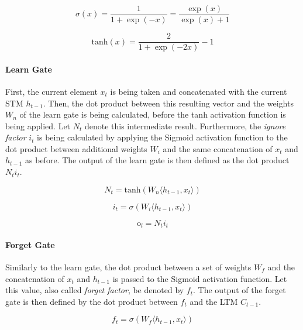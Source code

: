 \documentclass[11pt]{scrartcl}
\begin{document}
\begin{equation}
\label{eq:activation_sigmoid}
	\sigma(x) = \frac{1}{1 + \exp(-x)} = \frac{\exp(x)}{\exp(x) + 1}
\end{equation}

\begin{equation}
\label{eq:activation_tanh}
	\text{tanh}(x) = \frac{2}{1 + \exp(-2x)} -1
\end{equation}

\paragraph*{\textcolor{viridis3}{\textbf{Learn Gate}}}
First, the current element $x_t$ is being taken and concatenated with the current STM $h_{t-1}$. Then, the dot product between this resulting vector and the weights $W_n$ of the learn gate is being calculated, before the tanh activation function is being applied. Let $N_t$ denote this intermediate result. Furthermore, the \textit{ignore factor} $i_t$ is being calculated by applying the Sigmoid activation function to the dot product between additional weights $W_i$ and the same concatenation of $x_t$ and $h_{t-1}$ as before. The output of the learn gate is then defined as the dot product $N_t i_t$.

\begin{equation}
	N_t = \text{tanh}(W_n \langle h_{t-1}, x_t\rangle)
\end{equation}

\begin{equation}
	i_t = \sigma(W_i \langle h_{t-1}, x_t\rangle)
\end{equation}

\begin{equation}
	\text{o}_{l} = N_t i_t
\end{equation}

\paragraph*{\textcolor{viridis1}{\textbf{Forget Gate}}}
Similarly to the learn gate, the dot product between a set of weights $W_f$ and the concatenation of $x_t$ and $h_{t-1}$ is passed to the Sigmoid activation function. Let this value, also called \textit{forget factor}, be denoted by $f_t$. The output of the forget gate is then defined by the dot product between $f_t$ and the LTM $C_{t-1}$.

\begin{equation}
	f_t = \sigma(W_f \langle h_{t-1}, x_t\rangle)
\end{equation}
\end{document}
